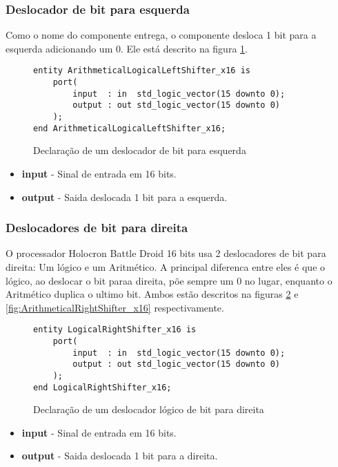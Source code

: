 \documentclass{article}
\newcommand\tab[1][0.50cm]{\hspace*{#1}}
\begin{document}
			\subsubsection[Deslocador para esquerda]{Deslocador de bit para esquerda}
				\tab Como o nome do componente entrega, o componente desloca 1 bit para a esquerda adicionando um 0. Ele est\'{a} descrito na figura \ref{fig:ArithmeticalLogicalLeftShifter_x16}.
				\begin{figure}[H]
					\centering
					\caption[Deslocador de bit para esquerda]{Declara\c{c}\~{a}o de um deslocador de bit para esquerda}
					\label{fig:ArithmeticalLogicalLeftShifter_x16}
					\begin{lstlisting}[style=vhdl]
entity ArithmeticalLogicalLeftShifter_x16 is
	port(
		input  : in  std_logic_vector(15 downto 0);
		output : out std_logic_vector(15 downto 0)
	);
end ArithmeticalLogicalLeftShifter_x16;
					\end{lstlisting}
				\end{figure}
				\begin{itemize}
					\item \textbf{input} - Sinal de entrada em 16 bits.
					\item \textbf{output} - Saida deslocada 1 bit para a esquerda.
				\end{itemize}
			\subsubsection[Deslocadores para direita]{Deslocadores de bit para direita}
				\tab O processador Holocron Battle Droid 16 bits usa 2 deslocadores de bit para direita: Um l\'{o}gico e um Aritm\'{e}tico. A principal diferenca entre eles \'{e} que o l\'{o}gico, ao deslocar o bit paraa direita, p\~{o}e sempre um 0 no lugar, enquanto o Aritm\'{e}tico duplica o ultimo bit. Ambos est\~{a}o descritos na figuras \ref{fig:LogicalRightShifter_x16} e \ref{fig:ArithmeticalRightShifter_x16} respectivamente.
				\begin{figure}[H]
					\centering
					\caption[Deslocador l\'{o}gico de bit para direita]{Declara\c{c}\~{a}o de um deslocador l\'{o}gico de bit para direita}
					\label{fig:LogicalRightShifter_x16}
					\begin{lstlisting}[style=vhdl]
entity LogicalRightShifter_x16 is
	port(
		input  : in  std_logic_vector(15 downto 0);
		output : out std_logic_vector(15 downto 0)
	);
end LogicalRightShifter_x16;
					\end{lstlisting}
				\end{figure}
				\begin{itemize}
					\item \textbf{input} - Sinal de entrada em 16 bits.
					\item \textbf{output} - Saida deslocada 1 bit para a direita.
				\end{itemize}
			
\end{document}
